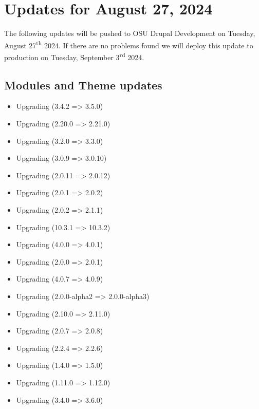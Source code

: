 \section{Updates for August 27, 2024}
The following updates will be pushed to OSU Drupal Development on Tuesday, August 27\textsuperscript{th} 2024.
If there are no problems found we will deploy this update to production on Tuesday, September 3\textsuperscript{rd} 2024.

\subsection{Modules and Theme updates}

\begin{itemize}
    \item Upgrading  (3.4.2 => 3.5.0)
    \item Upgrading  (2.20.0 => 2.21.0)
    \item Upgrading  (3.2.0 => 3.3.0)
    \item Upgrading  (3.0.9 => 3.0.10)
    \item Upgrading  (2.0.11 => 2.0.12)
    \item Upgrading  (2.0.1 => 2.0.2)
    \item Upgrading  (2.0.2 => 2.1.1)
    \item Upgrading  (10.3.1 => 10.3.2)
    \item Upgrading  (4.0.0 => 4.0.1)
    \item Upgrading  (2.0.0 => 2.0.1)
    \item Upgrading  (4.0.7 => 4.0.9)
    \item Upgrading  (2.0.0-alpha2 => 2.0.0-alpha3)
    \item Upgrading  (2.10.0 => 2.11.0)
    \item Upgrading  (2.0.7 => 2.0.8)
    \item Upgrading  (2.2.4 => 2.2.6)
    \item Upgrading  (1.4.0 => 1.5.0)
    \item Upgrading  (1.11.0 => 1.12.0)
    \item Upgrading  (3.4.0 => 3.6.0)

\end{itemize}
